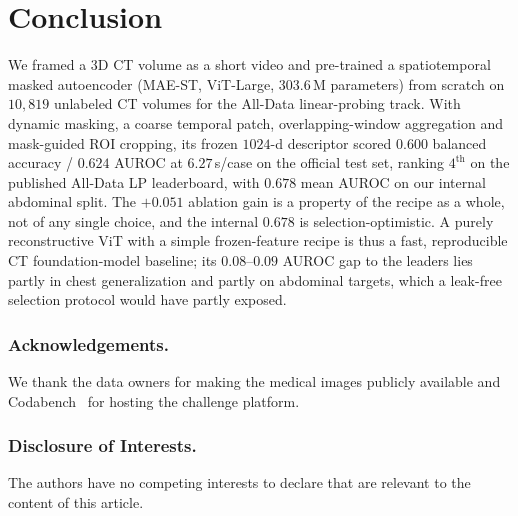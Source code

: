 \documentclass[runningheads]{llncs}
\begin{document}
\section{Conclusion}
We framed a 3D CT volume as a short video and pre-trained a spatiotemporal masked
autoencoder (MAE-ST, ViT-Large, $303.6$\,M parameters) from scratch on
$10{,}819$ unlabeled CT volumes for the All-Data linear-probing track. With
dynamic masking, a coarse temporal patch, overlapping-window aggregation and
mask-guided ROI cropping, its frozen $1024$-d descriptor scored $0.600$ balanced
accuracy / $0.624$ AUROC at $6.27$\,s/case on the official test set, ranking
$4^{\text{th}}$ on the published All-Data LP leaderboard, with $0.678$ mean AUROC
on our internal abdominal split. The $+0.051$ ablation gain is a property of the
recipe as a whole, not of any single choice, and the internal $0.678$ is
selection-optimistic. A purely reconstructive ViT with a simple frozen-feature
recipe is thus a fast, reproducible CT foundation-model baseline; its
$0.08$--$0.09$ AUROC gap to the leaders lies partly in chest generalization and
partly on abdominal targets, which a leak-free selection protocol would have
partly exposed.

\subsubsection{Acknowledgements.}
We thank the data owners for making the medical images publicly available and
Codabench~\cite{codabench} for hosting the challenge platform.

\subsubsection{Disclosure of Interests.}
The authors have no competing interests to declare that are relevant to the
content of this article.



\end{document}
